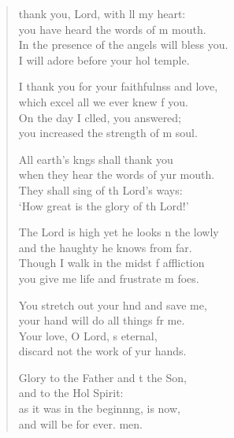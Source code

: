 \begin{verse}
  \begin{patverse}
 thank you, Lord, with ll my heart:\Med\\
you have heard the words of m mouth.\\
In the presence of the angels  will bless you.\Med\\
I will adore before your hol temple.

I thank you for your faithfulnss and love,\Med\\
which excel all we ever knew f you.\\
On the day I clled, you answered;\Med\\
you increased the strength of m soul.

All earth’s k\pointup{\i}ngs shall thank you\Med\\
when they hear the words of yur mouth.\\
They shall sing of th Lord’s ways:\Med\\
‘How great is the glory of th Lord!’

The Lord is high yet he looks n the lowly\Med\\
and the haughty he knows from far.\\
Though I walk in the midst f affliction\Med\\
you give me life and frustrate m foes.

You stretch out your hnd and save me,\Med\\
your hand will do all things fr me.\\
Your love, O Lord, \pointup{\i}s eternal,\Med\\
discard not the work of yur hands.

Glory to the Father and t the Son,\Med\\
and to the Hol Spirit:\\
as it was in the beginn\pointup{\i}ng, is now,\Med\\
and will be for ever. men.
  \end{patverse}
\end{verse}
